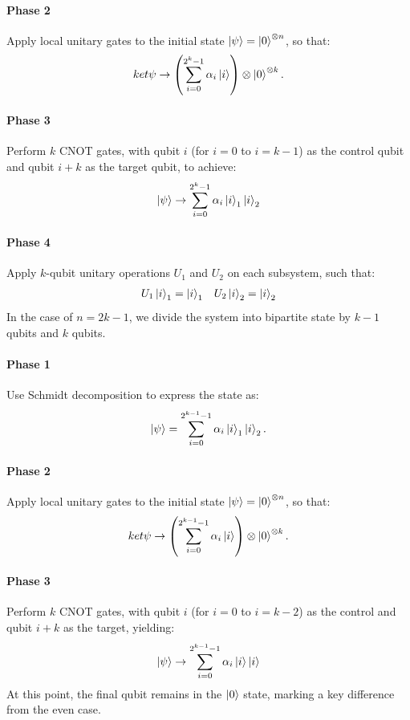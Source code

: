 \documentclass[a4paper, 11pt]{article}
\begin{document}
\paragraph{Phase 2}
Apply local unitary gates to the initial state $\ket{\psi} = \ket{0}^{\otimes n}$, so that:
\begin{align}
  ket{\psi} \rightarrow \left(\sum_{i=0}^{2^k -1} \alpha_{i} \ket{i} \right) \otimes \ket{0}^{\otimes k}.
\end{align}
\paragraph{Phase 3}
Perform $k$ CNOT gates, with qubit $i$ (for $i = 0$ to $i = k-1$) as the control qubit and qubit $i+k$ as the target qubit, to achieve:
\begin{equation}
  \ket{\psi} \rightarrow  \sum_{i=0}^{2^k -1} \alpha_{i} \ket{i}_1\ket{i}_2
\end{equation}
\paragraph{Phase 4}
Apply $k$-qubit unitary operations $U_1$ and $U_2$ on each subsystem, such that:
\begin{align}
  U_1 \ket{i}_1 = \ket{i}_1 && U_2 \ket{i}_2 = \ket{i}_2 
\end{align}
In the case of $n=2k-1$, we divide the system into bipartite state by $k-1$ qubits and $k$ qubits. 
\paragraph{Phase 1 }
Use Schmidt decomposition to express the state as:
\begin{equation}
  \ket{\psi} = \sum_{i=0}^{2^{k-1} -1} \alpha_{i} \ket{i}_1\ket{i}_2.
\end{equation}
\paragraph{Phase 2}
Apply local unitary gates to the initial state $\ket{\psi} = \ket{0}^{\otimes n}$, so that:
\begin{align}
  ket{\psi} \rightarrow \left(\sum_{i=0}^{2^{k-1} -1} \alpha_{i} \ket{i} \right) \otimes \ket{0}^{\otimes k}.
\end{align}
\paragraph{Phase 3}
Perform $k$ CNOT gates, with qubit $i$ (for $i = 0$ to $i = k-2$) as the control and qubit $i+k$ as the target, yielding:
\begin{equation}
  \ket{\psi} \rightarrow  \sum_{i=0}^{2^{k-1} -1} \alpha_{i} \ket{i}\ket{i}
\end{equation}
At this point, the final qubit remains in the $\ket{0}$ state, marking a key difference from the even case.
\end{document}
